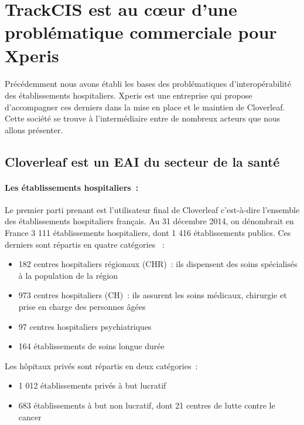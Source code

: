 	\section{TrackCIS est au cœur d'une problématique commerciale pour Xperis}
		\paragraph{}
		Précédemment nous avons établi les bases des problématiques d'interopérabilité
		des établissements hospitaliers. Xperis est une entreprise qui propose
		d'accompagner ces derniers dans la mise en place et le maintien de Cloverleaf.
		Cette société se trouve à l'intermédiaire entre de nombreux acteurs que nous
		allons présenter.
		
		\subsection{Cloverleaf est un EAI du secteur de la santé}
			\paragraph{Les établissements hospitaliers~:}%
			Le premier parti prenant est l'utilisateur final de
			Cloverleaf c'est-à-dire l'ensemble des établissements hospitaliers
			français.
			Au 31 décembre 2014, on dénombrait en France 3 111 établissements hospitaliers,
			dont 1 416 établissements publics. Ces derniers sont répartis en quatre
			catégories \citep{drees_panoramas_2016}~:
			\begin{itemize}
				\item 182 centres hospitaliers régionaux (CHR)~: ils dispensent des soins 
				spécialisés à la population de la région
				\item 973 centres hospitaliers (CH)~: ils assurent les soins médicaux, 
				chirurgie et prise en charge des personnes âgées
				\item 97 centres hospitaliers psychiatriques
				\item 164 établissements de soins longue durée
			\end{itemize}
			Les hôpitaux privés sont répartis en deux catégories~:
			\begin{itemize}
				\item 1 012 établissements privés à but lucratif
				\item 683 établissements à but non lucratif, dont 21 centres de lutte
				contre le cancer
			\end{itemize}
			
